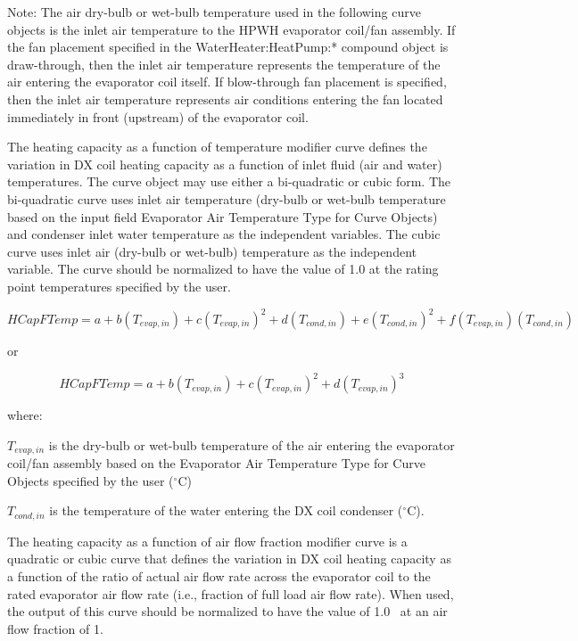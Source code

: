 Note: The air dry-bulb or wet-bulb temperature used in the following curve objects is the inlet air temperature to the HPWH evaporator coil/fan assembly. If the fan placement specified in the WaterHeater:HeatPump:* compound object is draw-through, then the inlet air temperature represents the temperature of the air entering the evaporator coil itself. If blow-through fan placement is specified, then the inlet air temperature represents air conditions entering the fan located immediately in front (upstream) of the evaporator coil.

The heating capacity as a function of temperature modifier curve defines the variation in DX coil heating capacity as a function of inlet fluid (air and water) temperatures. The curve object may use either a bi-quadratic or cubic form. The bi-quadratic curve uses inlet air temperature (dry-bulb or wet-bulb temperature based on the input field Evaporator Air Temperature Type for Curve Objects) and condenser inlet water temperature as the independent variables. The cubic curve uses inlet air (dry-bulb or wet-bulb) temperature as the independent variable. The curve should be normalized to have the value of 1.0 at the rating point temperatures specified by the user.

\begin{equation}
HCapFTemp = a + b\left( {{T_{evap,in}}} \right) + c{\left( {{T_{evap,in}}} \right)^2} + d\left( {{T_{cond,in}}} \right) + e{\left( {{T_{cond,in}}} \right)^2} + f\left( {{T_{evap,in}}} \right)\left( {{T_{cond,in}}} \right)
\end{equation}

or

\begin{equation}
HCapFTemp = a + b\left( {{T_{evap,in}}} \right) + c{\left( {{T_{evap,in}}} \right)^2} + d{\left( {{T_{evap,in}}} \right)^3}
\end{equation}

where:

\({T_{evap,in}}\) is the dry-bulb or wet-bulb temperature of the air entering the evaporator coil/fan assembly based on the Evaporator Air Temperature Type for Curve Objects specified by the user (\(^{\circ}\)C)

\({T_{cond,in}}\) is the temperature of the water entering the DX coil condenser (\(^{\circ}\)C).

The heating capacity as a function of air flow fraction modifier curve is a quadratic or cubic curve that defines the variation in DX coil heating capacity as a function of the ratio of actual air flow rate across the evaporator coil to the rated evaporator air flow rate (i.e., fraction of full load air flow rate). When used, the output of this curve should be normalized to have the value of 1.0~ at an air flow fraction of 1.

